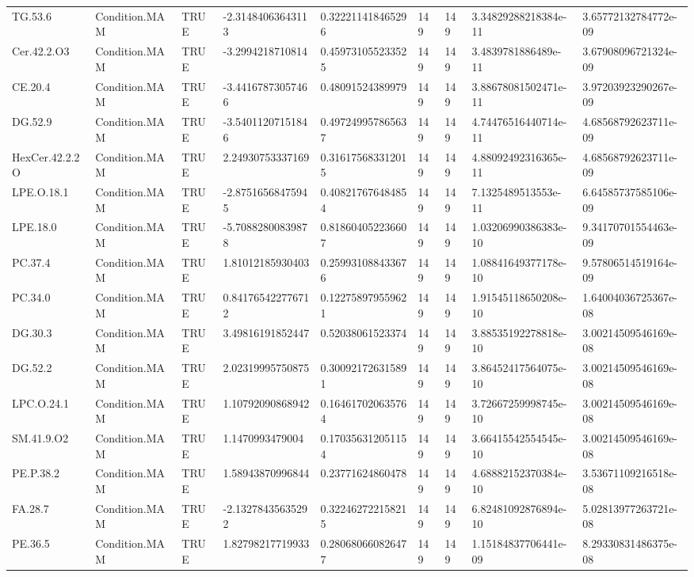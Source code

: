 \begin{longtable}{lllllllll}
TG.53.6 & Condition.MAM & TRUE & -2.31484063643113 & 0.322211418465296 & 149 & 149 & 3.34829288218384e-11 & 3.65772132784772e-09 \\
Cer.42.2.O3 & Condition.MAM & TRUE & -3.2994218710814 & 0.459731055233525 & 149 & 149 & 3.4839781886489e-11 & 3.67908096721324e-09 \\
CE.20.4 & Condition.MAM & TRUE & -3.44167873057466 & 0.48091524389979 & 149 & 149 & 3.88678081502471e-11 & 3.97203923290267e-09 \\
DG.52.9 & Condition.MAM & TRUE & -3.54011207151846 & 0.497249957865637 & 149 & 149 & 4.74476516440714e-11 & 4.68568792623711e-09 \\
HexCer.42.2.2O & Condition.MAM & TRUE & 2.24930753337169 & 0.316175683312015 & 149 & 149 & 4.88092492316365e-11 & 4.68568792623711e-09 \\
LPE.O.18.1 & Condition.MAM & TRUE & -2.87516568475945 & 0.408217676484854 & 149 & 149 & 7.1325489513553e-11 & 6.64585737585106e-09 \\
LPE.18.0 & Condition.MAM & TRUE & -5.70882800839878 & 0.818604052236607 & 149 & 149 & 1.03206990386383e-10 & 9.34170701554463e-09 \\
PC.37.4 & Condition.MAM & TRUE & 1.81012185930403 & 0.259931088433676 & 149 & 149 & 1.08841649377178e-10 & 9.57806514519164e-09 \\
PC.34.0 & Condition.MAM & TRUE & 0.841765422776712 & 0.122758979559621 & 149 & 149 & 1.91545118650208e-10 & 1.64004036725367e-08 \\
DG.30.3 & Condition.MAM & TRUE & 3.49816191852447 & 0.52038061523374 & 149 & 149 & 3.88535192278818e-10 & 3.00214509546169e-08 \\
DG.52.2 & Condition.MAM & TRUE & 2.02319995750875 & 0.300921726315891 & 149 & 149 & 3.86452417564075e-10 & 3.00214509546169e-08 \\
LPC.O.24.1 & Condition.MAM & TRUE & 1.10792090868942 & 0.164617020635764 & 149 & 149 & 3.72667259998745e-10 & 3.00214509546169e-08 \\
SM.41.9.O2 & Condition.MAM & TRUE & 1.1470993479004 & 0.170356312051154 & 149 & 149 & 3.66415542554545e-10 & 3.00214509546169e-08 \\
PE.P.38.2 & Condition.MAM & TRUE & 1.58943870996844 & 0.23771624860478 & 149 & 149 & 4.68882152370384e-10 & 3.53671109216518e-08 \\
FA.28.7 & Condition.MAM & TRUE & -2.13278435635292 & 0.322462722158215 & 149 & 149 & 6.82481092876894e-10 & 5.02813977263721e-08 \\
PE.36.5 & Condition.MAM & TRUE & 1.82798217719933 & 0.280680660826477 & 149 & 149 & 1.15184837706441e-09 & 8.29330831486375e-08 \\

\end{longtable}
